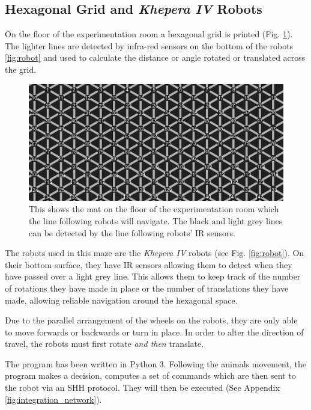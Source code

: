 \subsection{Hexagonal Grid and \textit{Khepera IV} Robots}

On the floor of the experimentation room a hexagonal grid is printed (Fig. \ref{fig:hexgrid_with_numbers}). The lighter lines are detected by infra-red sensors on the bottom of the robots \ref{fig:robot} and used to calculate the distance or angle rotated or translated across the grid.

\begin{figure}[h]
    \centering
    \includegraphics[scale = 0.3]{images/hexgrid_with_numbers.png}
    \caption{This shows the mat on the floor of the experimentation room which the line following robots will navigate. The black and light grey lines can be detected by the line following robots' IR sensors.}
    \label{fig:hexgrid_with_numbers}
\end{figure}



The robots used in this maze are the \textit{Khepera IV} robots (see Fig. \ref{fig:robot}). On their bottom surface, they have IR sensors allowing them to detect when they have passed over a light grey line. 
This allows them to keep track of the number of rotations they have made in place or the number of translations they have made, allowing reliable navigation around the hexagonal space.

Due to the parallel arrangement of the wheels on the robots, they are only able to move forwards or backwards or turn in place. In order to alter the direction of travel, the robots must first rotate \textit{and then} translate.

The program has been written in Python 3. Following the animals movement, the program makes a decision, computes a set of commands which are then sent to the robot via an SHH protocol. They will then be executed (See Appendix \ref{fig:integration_network}).

